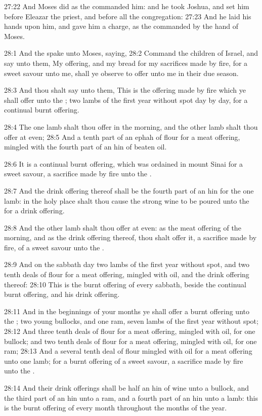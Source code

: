 27:22 And Moses did as the \LORD commanded him: and he took Joshua, and set him before Eleazar the priest, and before all the congregation: 27:23 And he laid his hands upon him, and gave him a charge, as the \LORD commanded by the hand of Moses.

28:1 And the \LORD spake unto Moses, saying, 28:2 Command the children of Israel, and say unto them, My offering, and my bread for my sacrifices made by fire, for a sweet savour unto me, shall ye observe to offer unto me in their due season.

28:3 And thou shalt say unto them, This is the offering made by fire which ye shall offer unto the \LORD; two lambs of the first year without spot day by day, for a continual burnt offering.

28:4 The one lamb shalt thou offer in the morning, and the other lamb shalt thou offer at even; 28:5 And a tenth part of an ephah of flour for a meat offering, mingled with the fourth part of an hin of beaten oil.

28:6 It is a continual burnt offering, which was ordained in mount Sinai for a sweet savour, a sacrifice made by fire unto the \LORD.

28:7 And the drink offering thereof shall be the fourth part of an hin for the one lamb: in the holy place shalt thou cause the strong wine to be poured unto the \LORD for a drink offering.

28:8 And the other lamb shalt thou offer at even: as the meat offering of the morning, and as the drink offering thereof, thou shalt offer it, a sacrifice made by fire, of a sweet savour unto the \LORD.

28:9 And on the sabbath day two lambs of the first year without spot, and two tenth deals of flour for a meat offering, mingled with oil, and the drink offering thereof: 28:10 This is the burnt offering of every sabbath, beside the continual burnt offering, and his drink offering.

28:11 And in the beginnings of your months ye shall offer a burnt offering unto the \LORD; two young bullocks, and one ram, seven lambs of the first year without spot; 28:12 And three tenth deals of flour for a meat offering, mingled with oil, for one bullock; and two tenth deals of flour for a meat offering, mingled with oil, for one ram; 28:13 And a several tenth deal of flour mingled with oil for a meat offering unto one lamb; for a burnt offering of a sweet savour, a sacrifice made by fire unto the \LORD.

28:14 And their drink offerings shall be half an hin of wine unto a bullock, and the third part of an hin unto a ram, and a fourth part of an hin unto a lamb: this is the burnt offering of every month throughout the months of the year.

